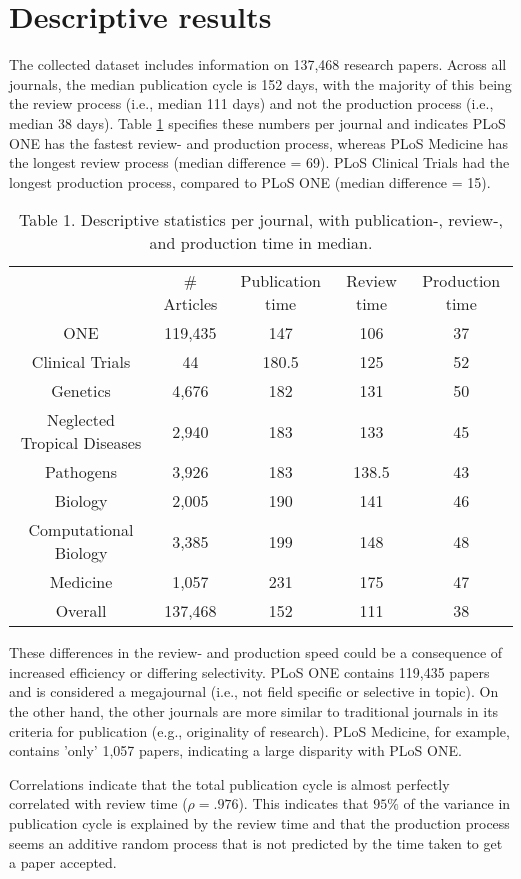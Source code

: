 \section*{Descriptive results}
The collected dataset includes information on 137,468 research papers. Across all journals, the median publication cycle is 152 days, with the majority of this being the review process (i.e., median 111 days) and not the production process (i.e., median 38 days). Table \ref{tab:tab1} specifies these numbers per journal and indicates PLoS ONE has the fastest review- and production process, whereas PLoS Medicine has the longest review process (median difference = 69). PLoS Clinical Trials had the longest production process, compared to PLoS ONE (median difference = 15).

\begin{table}
\caption{Table 1. Descriptive statistics per journal, with publication-, review-, and production time in median.}
\label{tab:tab1}
\begin{tabular}{ c c c c c }
          & \# Articles & Publication time & Review time & Production time \\
    ONE   & 119,435 & 147   & 106   & 37 \\
    Clinical Trials & 44    & 180.5 & 125   & 52 \\
    Genetics & 4,676  & 182   & 131   & 50 \\
    Neglected Tropical Diseases & 2,940  & 183   & 133   & 45 \\
    Pathogens & 3,926  & 183   & 138.5 & 43 \\
    Biology & 2,005  & 190   & 141   & 46 \\
    Computational Biology & 3,385  & 199   & 148   & 48 \\
    Medicine & 1,057  & 231   & 175   & 47 \\
    Overall & 137,468 & 152   & 111   & 38 \\
\end{tabular}
\end{table}

These differences in the review- and production speed could be a consequence of increased efficiency or differing selectivity. PLoS ONE contains 119,435 papers and is considered a megajournal (i.e., not field specific or selective in topic). On the other hand, the other journals are more similar to traditional journals in its criteria for publication (e.g., originality of research). PLoS Medicine, for example, contains 'only' 1,057 papers, indicating a large disparity with PLoS ONE. 

Correlations indicate that the total publication cycle is almost perfectly correlated with review time ($\rho=.976$). This indicates that $95\%$ of the variance in publication cycle is explained by the review time and that the production process seems an additive random process that is not predicted by the time taken to get a paper accepted.